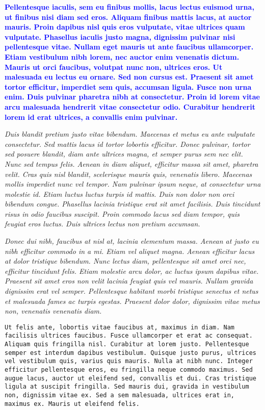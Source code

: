 \documentclass{article}
\begin{document}
{\textcolor{blue}{\textbf{Pellentesque iaculis, sem eu finibus mollis, lacus lectus euismod urna, ut finibus nisi diam sed eros. Aliquam finibus mattis lacus, at auctor mauris. Proin dapibus nisl quis eros vulputate, vitae ultrices quam vulputate. Phasellus iaculis justo magna, dignissim pulvinar nisi pellentesque vitae. Nullam eget mauris ut ante faucibus ullamcorper. Etiam vestibulum nibh lorem, nec auctor enim venenatis dictum. Mauris ut orci faucibus, volutpat nunc non, ultrices eros. Ut malesuada eu lectus eu ornare. Sed non cursus est. Praesent sit amet tortor efficitur, imperdiet sem quis, accumsan ligula. Fusce non urna enim. Duis pulvinar pharetra nibh at consectetur. Proin id lorem vitae arcu malesuada hendrerit vitae consectetur odio. Curabitur hendrerit lorem id erat ultrices, a convallis enim pulvinar.}}

\tiny{\textit{Duis blandit pretium justo vitae bibendum. Maecenas et metus eu ante vulputate consectetur. Sed mattis lacus id tortor lobortis efficitur. Donec pulvinar, tortor sed posuere blandit, diam ante ultrices magna, et semper purus sem nec elit. Nunc sed tempus felis. Aenean in diam aliquet, efficitur massa sit amet, pharetra velit. Cras quis nisl blandit, scelerisque mauris quis, venenatis libero. Maecenas mollis imperdiet nunc vel tempor. Nam pulvinar ipsum neque, at consectetur urna molestie id. Etiam luctus luctus turpis id mattis. Duis non dolor non orci bibendum congue. Phasellus lacinia tristique erat sit amet facilisis. Duis tincidunt risus in odio faucibus suscipit. Proin commodo lacus sed diam tempor, quis feugiat eros luctus. Duis ultrices lectus non pretium accumsan.}}

\large{\emph{Donec dui nibh, faucibus at nisl at, lacinia elementum massa. Aenean at justo eu nibh efficitur commodo in a mi. Etiam vel aliquet magna. Aenean efficitur lacus at dolor tristique bibendum. Nunc lectus diam, pellentesque sit amet orci nec, efficitur tincidunt felis. Etiam molestie arcu dolor, ac luctus ipsum dapibus vitae. Praesent sit amet eros non velit lacinia feugiat quis vel mauris. Nullam gravida dignissim erat vel semper. Pellentesque habitant morbi tristique senectus et netus et malesuada fames ac turpis egestas. Praesent dolor dolor, dignissim vitae metus non, venenatis venenatis diam.}}

\texttt{\Huge{Ut felis ante, lobortis vitae faucibus at, maximus in diam. Nam facilisis ultrices faucibus. Fusce ullamcorper et erat ac consequat. Aliquam quis fringilla nisl. Curabitur at lorem justo. Pellentesque semper est interdum dapibus vestibulum. Quisque justo purus, ultrices vel vestibulum quis, varius quis mauris. Nulla at nibh nunc. Integer efficitur pellentesque eros, eu fringilla neque commodo maximus. Sed augue lacus, auctor ut eleifend sed, convallis et dui. Cras tristique ligula at suscipit fringilla. Sed mauris dui, gravida in vestibulum non, dignissim vitae ex. Sed a sem malesuada, ultrices erat in, maximus ex. Mauris ut eleifend felis.}}

}
\end{document}
